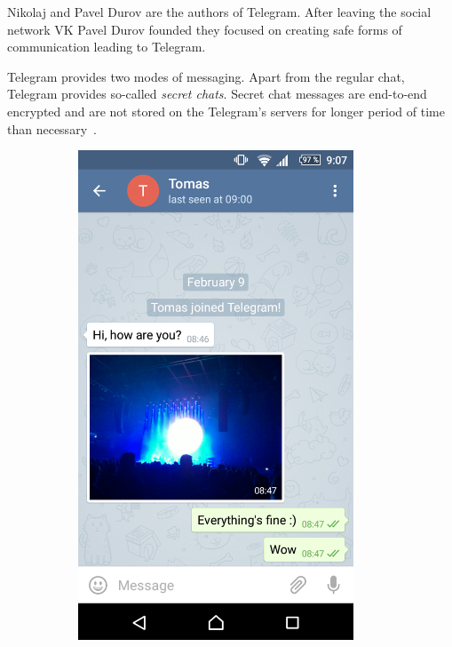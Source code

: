 \documentclass[thesis=M,english]{FITthesis}[2012/10/20]
\begin{document}
Nikolaj and Pavel Durov are the authors of Telegram. After leaving the social network VK Pavel Durov founded they focused on creating safe forms of communication leading to Telegram.

Telegram provides two modes of messaging. Apart from the regular chat, Telegram provides so-called \emph{secret chats}. Secret chat messages are end-to-end encrypted and are not stored on the Telegram's servers for longer period of time than necessary~\cite{telegramfaq}.

\begin{figure}[htb]
	\centering
	\label{A}
	\begin{subfigure}[b]{0.4\textwidth}
		\centering
		\includegraphics[width=0.9\textwidth]{telegram-regular.png}

\end{subfigure}
\end{figure}
\end{document}

